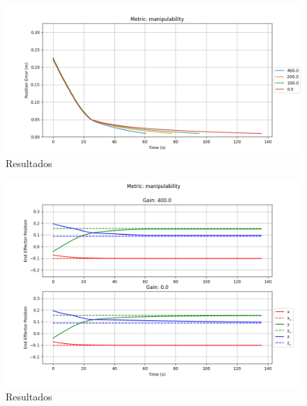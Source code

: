\begin{figure}
    \centering
    \includegraphics[width=1.0\textwidth]{Images/manipulability/position_error_manipulability.png}
    \caption{Resultados}\label{fig:m-e}
\end{figure}

\begin{figure}
    \centering
    \includegraphics[width=1.0\textwidth]{Images/manipulability/position_manipulability.png}
    \caption{Resultados}\label{fig:m-p}
\end{figure}

